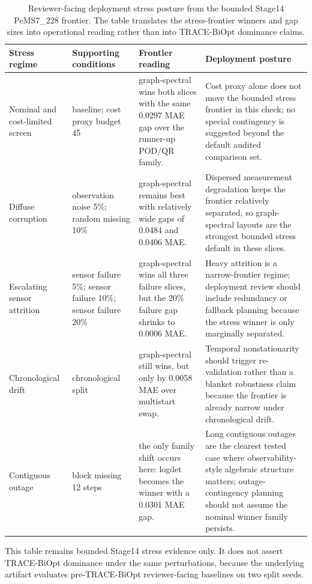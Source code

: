 \begin{table}[pos=htbp]
\centering
\caption{Reviewer-facing deployment stress posture from the bounded Stage14 PeMS7\_228 frontier. The table translates the stress-frontier winners and gap sizes into operational reading rather than into TRACE-BiOpt dominance claims.}
\label{tab:trace-biopt-deployment-stress-posture}
\scriptsize
\begin{tabularx}{\textwidth}{>{\raggedright\arraybackslash}p{}>{\raggedright\arraybackslash}p{}>{\raggedright\arraybackslash}p{}>{\raggedright\arraybackslash}X}
\toprule
Stress regime & Supporting conditions & Frontier reading & Deployment posture \\
\midrule
Nominal and cost-limited screen & baseline; cost proxy budget 45 & graph-spectral wins both slices with the same 0.0297 MAE gap over the runner-up POD/QR family. & Cost proxy alone does not move the bounded stress frontier in this check; no special contingency is suggested beyond the default audited comparison set. \\
Diffuse corruption & observation noise 5\%; random missing 10\% & graph-spectral remains best with relatively wide gaps of 0.0484 and 0.0406 MAE. & Dispersed measurement degradation keeps the frontier relatively separated, so graph-spectral layouts are the strongest bounded stress default in these slices. \\
Escalating sensor attrition & sensor failure 5\%; sensor failure 10\%; sensor failure 20\% & graph-spectral wins all three failure slices, but the 20\% failure gap shrinks to 0.0006 MAE. & Heavy attrition is a narrow-frontier regime; deployment review should include redundancy or fallback planning because the stress winner is only marginally separated. \\
Chronological drift & chronological split & graph-spectral still wins, but only by 0.0058 MAE over multistart swap. & Temporal nonstationarity should trigger re-validation rather than a blanket robustness claim because the frontier is already narrow under chronological drift. \\
Contiguous outage & block missing 12 steps & the only family shift occurs here: logdet becomes the winner with a 0.0301 MAE gap. & Long contiguous outages are the clearest tested case where observability-style algebraic structure matters; outage-contingency planning should not assume the nominal winner family persists. \\
\bottomrule
\end{tabularx}
\begin{flushleft}\footnotesize This table remains bounded Stage14 stress evidence only. It does not assert TRACE-BiOpt dominance under the same perturbations, because the underlying artifact evaluates pre-TRACE-BiOpt reviewer-facing baselines on two split seeds.\end{flushleft}
\end{table}
